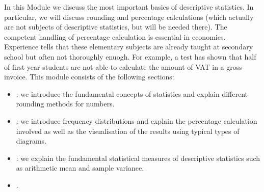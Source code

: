 
\Mtikzexternalize




\begin{MSectionStart}

In this Module we discuss the most important basics of descriptive statistics. In particular, we will 
discuss rounding and percentage calculations (which actually are not subjects of descriptive 
statistics, but will be needed there). The competent handling of percentage calculation
is essential in economics. Experience tells that these elementary subjects are already taught at secondary school
but often not thoroughly enuogh. For example, a test has shown that 
half of first year students are not able to calculate the amount of VAT in a gross invoice. 
This module consists of the following sections:


\begin{itemize}
\item{: we introduce the fundamental concepts of statistics and explain different 
rounding methods for numbers.}
\item{: we introduce frequency distributions and explain 
the percentage calculation involved as well as the visualisation of the results using typical types of diagrams.}
\item{: we explain the fundamental statistical measures of descriptive statistics 
such as arithmetic mean and sample variance.}
\item{.}
\end{itemize}

\end{MSectionStart}



